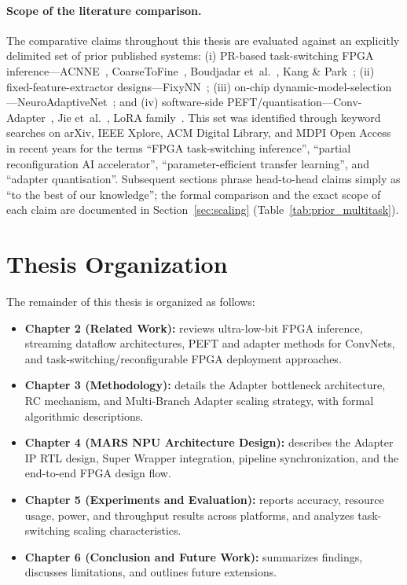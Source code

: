 \documentclass[12pt, a4paper]{report}
\numberwithin{equation}{chapter}
\numberwithin{figure}{chapter}
\numberwithin{table}{chapter}
\numberwithin{algorithm}{chapter}
\begin{document}
\paragraph{Scope of the literature comparison.} The comparative claims throughout this thesis are evaluated against an explicitly delimited set of prior published systems: (i) PR-based task-switching FPGA inference---ACNNE~\cite{Huang2024ACNNE}, CoarseToFine~\cite{Rangsikunpum2024CoarseToFine}, Boudjadar et~al.~\cite{Boudjadar2025DynamicFPGA}, Kang \& Park~\cite{Kang2025RuntimeRobust}; (ii) fixed-feature-extractor designs---FixyNN~\cite{Whatmough2019FixyNN}; (iii) on-chip dynamic-model-selection---NeuroAdaptiveNet~\cite{ElBouazzaoui2025NeuroAdaptive}; and (iv) software-side PEFT/quantisation---Conv-Adapter~\cite{Chen2024ConvAdapter}, Jie et~al.~\cite{Jie2023PrecisionRedundancy}, LoRA family~\cite{Hu2022LoRA, Ding2024LoRAC, Kwak2025LoRAEdge}. This set was identified through keyword searches on arXiv, IEEE Xplore, ACM Digital Library, and MDPI Open Access in recent years for the terms ``FPGA task-switching inference'', ``partial reconfiguration AI accelerator'', ``parameter-efficient transfer learning'', and ``adapter quantisation''. Subsequent sections phrase head-to-head claims simply as ``to the best of our knowledge''; the formal comparison and the exact scope of each claim are documented in Section~\ref{sec:scaling} (Table~\ref{tab:prior_multitask}).

\section{Thesis Organization}

The remainder of this thesis is organized as follows:

\begin{itemize}
\raggedright
  \item \textbf{Chapter 2 (Related Work):} reviews ultra-low-bit FPGA inference, streaming dataflow architectures, PEFT and adapter methods for ConvNets, and task-switching/reconfigurable FPGA deployment approaches.
  \item \textbf{Chapter 3 (Methodology):} details the Adapter bottleneck architecture, RC mechanism, and Multi-Branch Adapter scaling strategy, with formal algorithmic descriptions.
  \item \textbf{Chapter 4 (MARS NPU Architecture Design):} describes the Adapter IP RTL design, Super Wrapper integration, pipeline synchronization, and the end-to-end FPGA design flow.
  \item \textbf{Chapter 5 (Experiments and Evaluation):} reports accuracy, resource usage, power, and throughput results across platforms, and analyzes task-switching scaling characteristics.
  \item \textbf{Chapter 6 (Conclusion and Future Work):} summarizes findings, discusses limitations, and outlines future extensions.
\end{itemize}
\end{document}
